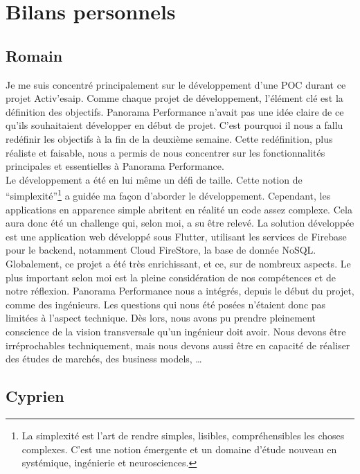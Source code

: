 \section{Bilans personnels}
\subsection*{Romain}

Je me suis concentré principalement sur le développement d’une POC durant ce projet Activ’esaip. Comme chaque projet de développement, l’élément clé est la définition des objectifs. Panorama Performance n’avait pas une idée claire de ce qu’ils souhaitaient développer en début de projet. C’est pourquoi il nous a fallu redéfinir les objectifs à la fin de la deuxième semaine. Cette redéfinition, plus réaliste et faisable, nous a permis de nous concentrer sur les fonctionnalités principales et essentielles à Panorama Performance.\\

Le développement a été en lui même un défi de taille. Cette notion de “simplexité”\footnote{La simplexité est l’art de rendre simples, lisibles, compréhensibles les choses complexes. C'est une notion émergente et un domaine d'étude nouveau en systémique, ingénierie et neurosciences.} a guidée ma façon d’aborder le développement. Cependant, les applications en apparence simple abritent en réalité un code assez complexe. Cela aura donc été un challenge qui, selon moi, a su être relevé.
La solution développée est une application web développé sous Flutter, utilisant les services de Firebase pour le backend, notamment Cloud FireStore, la base de donnée NoSQL. \hfill \\

Globalement, ce projet a été très enrichissant, et ce, sur de nombreux aspects. Le plus important selon moi est la pleine considération de nos compétences et de notre réflexion. Panorama Performance nous a intégrés, depuis le début du projet, comme des ingénieurs. Les questions qui nous été posées n’étaient donc pas limitées à l’aspect technique. Dès lors, nous avons pu prendre pleinement conscience de la vision transversale qu’un ingénieur doit avoir. Nous devons être irréprochables techniquement, mais nous devons aussi être en capacité de réaliser des études de marchés, des business models, …

\subsection*{Cyprien}

